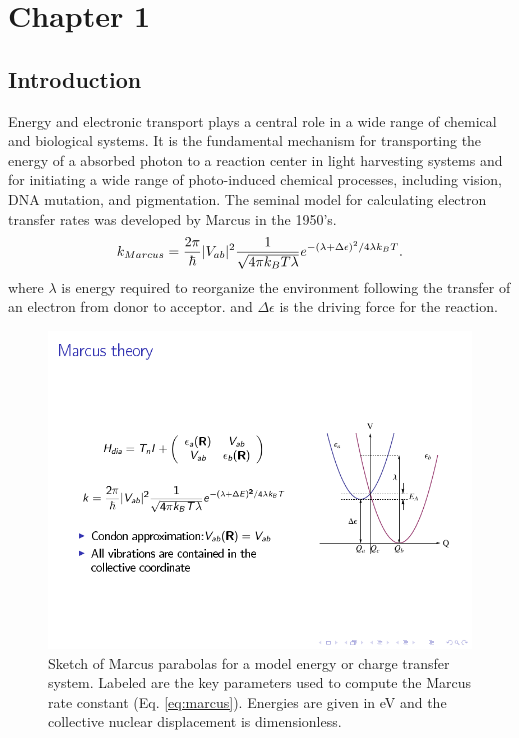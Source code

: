 \chapter{Chapter 1}
\section{Introduction}

Energy and electronic transport plays a central role in a
wide range of  chemical  and biological systems.
It is the fundamental mechanism for transporting the  energy  of a
absorbed photon to a reaction center in light harvesting systems
and for initiating a wide range of photo-induced  chemical processes,
including vision, DNA mutation, and pigmentation.
The seminal model for calculating electron transfer rates was developed by
Marcus in the 1950's\cite{marcus1956theory,marcus1965theory,marcus1993electron}.
\begin{equation}
k_{Marcus}=\frac{2\pi}{\hbar}|V_{ab}|^{2}\frac{1}{\sqrt{4\text{\ensuremath{\pi}}k_{B}T\lambda}}e^{-(\lambda+ \Delta\epsilon)^{2}/4\text{\ensuremath{\lambda}}k_{B}T}.\label{eq:marcus}
\end{equation}
where $\lambda$ is  energy required to reorganize the environment
following the transfer of an electron from donor to acceptor.
and $\Delta \epsilon$ is the driving force for the reaction.

\begin{figure}[h]
\includegraphics[width=0.5\columnwidth]{Chapters/chap2/Figure1}
\caption{Sketch of Marcus parabolas for a model energy or charge transfer system.
Labeled are the key parameters used to compute the Marcus rate constant (Eq. \ref{eq:marcus}).
Energies are given in eV and the collective nuclear displacement  is dimensionless.
}
\label{marcus}
\end{figure}


